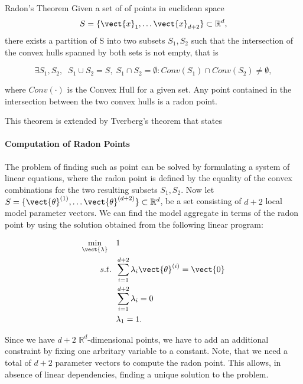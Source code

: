 \begin{threm}[label=thm:radon]{Radon's Theorem}
    Given a set of of points in euclidean space
    \begin{equation}
        S = \{\vect{x}_1, \ldots \vect{x}_{d+2}\} \subset \mathbb{R}^d,
    \end{equation}
   there exists a partition of S into two subsets $S_1, S_2$ such that the intersection of the convex hulls spanned by both sets is not empty, that is
    
    \begin{equation}
        \exists S_1, S_2, \;\; S_1 \cup S_2 = S, \; S_1 \cap S_2 = \emptyset: Conv(S_1) \cap Conv(S_2) \neq \emptyset,
    \end{equation}

    where $Conv(\cdot)$ is the Convex Hull for a given set.
    Any point contained  in the intersection between the two convex hulls is a radon point.
\end{threm}

This theorem is extended by Tverberg's theorem that states 
\paragraph*{Computation of Radon Points}

The problem of finding such as point can be solved by formulating a system of linear equations, where the radon point is defined by the equality of the convex combinations for the two resulting subsets $S_1, S_2$.
Now let $S = \{\vect{\theta}^{(1)}, \ldots \vect{\theta}^{(d+2)}\} \subset \mathbb{R}^d$, be a set consisting of $d+2$ local model parameter vectors.
We can find the model aggregate in terms of the radon point by using the solution obtained from the following linear program:

\begin{equation}
    \label{eq:radonopt}
    \begin{split}
        \min_{\vect{\lambda}} \quad &1 \\
        s.t. \;\; &\sum_{i=1}^{d+2} \lambda_i \vect{\theta}^{(i)} = \vect{0}\\
             \;\; &\sum_{i=1}^{d+2} \lambda_i = 0 \\
             \; \; & \lambda_1 = 1.
    \end{split}
\end{equation}

Since we have $d+2$ $\mathbb{R}^d$-dimensional points, we have to add an additional constraint by fixing one arbritary variable to a constant. 
Note, that we need a total of $d+2$ parameter vectors to compute the radon point.
This allows, in absence of linear dependencies, finding a unique solution to the problem.


